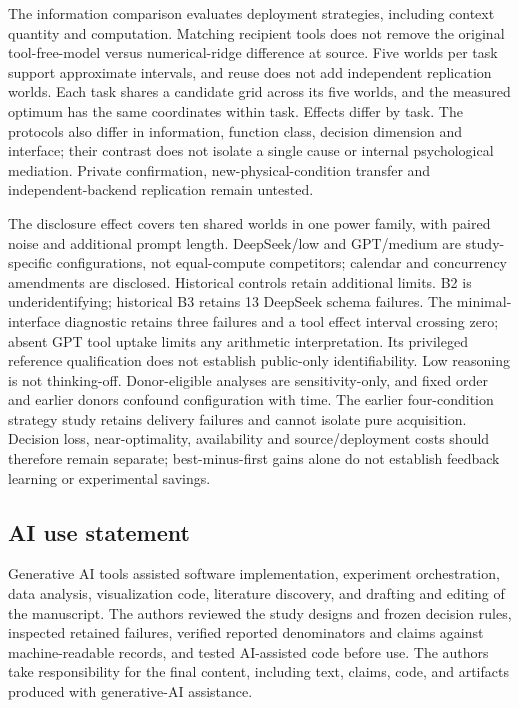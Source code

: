 \documentclass{article}
\begin{document}
The information comparison evaluates deployment strategies, including
context quantity and computation. Matching recipient tools does not
remove the original tool-free-model versus numerical-ridge difference at
source. Five worlds per task support approximate intervals, and reuse
does not add independent replication worlds. Each task shares a
candidate grid across its five worlds, and the measured optimum has the
same coordinates within task. Effects differ by task. The protocols also
differ in information, function class, decision dimension and interface;
their contrast does not isolate a single cause or internal psychological
mediation. Private confirmation, new-physical-condition transfer and
independent-backend replication remain untested.

The disclosure effect covers ten shared worlds in one power family, with
paired noise and additional prompt length. DeepSeek/low and GPT/medium
are study-specific configurations, not equal-compute competitors;
calendar and concurrency amendments are disclosed. Historical controls
retain additional limits. B2 is underidentifying; historical B3 retains
13 DeepSeek schema failures. The minimal-interface diagnostic retains
three failures and a tool effect interval crossing zero; absent GPT tool
uptake limits any arithmetic interpretation. Its privileged reference
qualification does not establish public-only identifiability. Low
reasoning is not thinking-off. Donor-eligible analyses are
sensitivity-only, and fixed order and earlier donors confound
configuration with time. The earlier four-condition strategy study
retains delivery failures and cannot isolate pure acquisition. Decision
loss, near-optimality, availability and source/deployment costs should
therefore remain separate; best-minus-first gains alone do not establish
feedback learning or experimental savings.

\label{iclr-main-text-end}
\clearpage

\subsection*{AI use statement}
Generative AI tools assisted software implementation, experiment orchestration, data analysis,
visualization code, literature discovery, and drafting and editing of the manuscript. The authors
reviewed the study designs and frozen decision rules, inspected retained failures, verified reported
denominators and claims against machine-readable records, and tested AI-assisted code before use.
The authors take responsibility for the final content, including text, claims, code, and artifacts
produced with generative-AI assistance.
\end{document}
